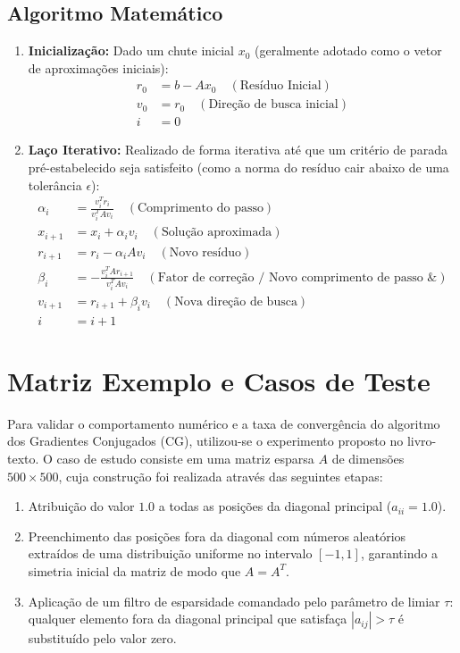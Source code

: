 \documentclass[12pt,a4paper]{article}
\begin{document}
\subsection{Algoritmo Matemático}
\begin{enumerate}
    \item \textbf{Inicialização:}
    Dado um chute inicial $x_0$ (geralmente adotado como o vetor de aproximações iniciais):
    \begin{align*}
        r_0 &= b - A x_0 \quad (\text{Resíduo Inicial}) \\
        v_0 &= r_0 \quad (\text{Direção de busca inicial}) \\
        i &= 0
    \end{align*}
    
    \item \textbf{Laço Iterativo:} Realizado de forma iterativa até que um critério de parada pré-estabelecido seja satisfeito (como a norma do resíduo cair abaixo de uma tolerância $\epsilon$):
    \begin{align*}
        \alpha_i &= \frac{v_i^T r_i}{v_i^T A v_i} \quad (\text{Comprimento do passo}) \\[1.5ex]
        x_{i+1} &= x_i + \alpha_i v_i \quad (\text{Solução aproximada}) \\[1.5ex]
        r_{i+1} &= r_i - \alpha_i A v_i \quad (\text{Novo resíduo}) \\[1.5ex]
        \beta_i &= -\frac{v_i^T A r_{i+1}}{v_i^T A v_i} \quad (\text{Fator de correção / Novo comprimento de passo \&}) \\[1.5ex]
        v_{i+1} &= r_{i+1} + \beta_i v_i \quad (\text{Nova direção de busca}) \\[1.5ex]
        i &= i + 1
    \end{align*}
\end{enumerate}


\section{Matriz Exemplo e Casos de Teste}
Para validar o comportamento numérico e a taxa de convergência do algoritmo dos Gradientes Conjugados (CG), utilizou-se o experimento proposto no livro-texto. O caso de estudo consiste em uma matriz esparsa $A$ de dimensões $500 \times 500$, cuja construção foi realizada através das seguintes etapas:
\begin{enumerate}
    \item Atribuição do valor $1.0$ a todas as posições da diagonal principal ($a_{ii} = 1.0$).
    \item Preenchimento das posições fora da diagonal com números aleatórios extraídos de uma distribuição uniforme no intervalo $[-1, 1]$, garantindo a simetria inicial da matriz de modo que $A = A^T$.
    \item Aplicação de um filtro de esparsidade comandado pelo parâmetro de limiar $\tau$: qualquer elemento fora da diagonal principal que satisfaça $|a_{ij}| > \tau$ é substituído pelo valor zero.
\end{enumerate}
\end{document}
